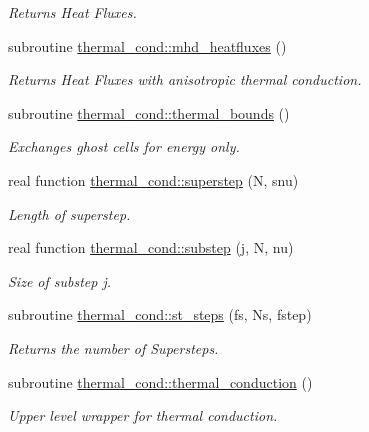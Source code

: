 \begin{DoxyCompactItemize}
\begin{DoxyCompactList}\small\item\em Returns Heat Fluxes. \end{DoxyCompactList}\item 
subroutine \hyperlink{namespacethermal__cond_aab43551b6a0d4b5894c07b510e4571d7}{thermal\+\_\+cond\+::mhd\+\_\+heatfluxes} ()
\begin{DoxyCompactList}\small\item\em Returns Heat Fluxes with anisotropic thermal conduction. \end{DoxyCompactList}\item 
subroutine \hyperlink{namespacethermal__cond_a55e65df0c700580f8af0a090063d2e32}{thermal\+\_\+cond\+::thermal\+\_\+bounds} ()
\begin{DoxyCompactList}\small\item\em Exchanges ghost cells for energy only. \end{DoxyCompactList}\item 
real function \hyperlink{namespacethermal__cond_a535cc1746914d413d4978aeda7b8fc06}{thermal\+\_\+cond\+::superstep} (N, snu)
\begin{DoxyCompactList}\small\item\em Length of superstep. \end{DoxyCompactList}\item 
real function \hyperlink{namespacethermal__cond_a782aaba01217281f2aa57dcc955fd294}{thermal\+\_\+cond\+::substep} (j, N, nu)
\begin{DoxyCompactList}\small\item\em Size of substep j. \end{DoxyCompactList}\item 
subroutine \hyperlink{namespacethermal__cond_a4c74dc0fd6a165d0fea419b560943701}{thermal\+\_\+cond\+::st\+\_\+steps} (fs, Ns, fstep)
\begin{DoxyCompactList}\small\item\em Returns the number of Supersteps. \end{DoxyCompactList}\item 
subroutine \hyperlink{namespacethermal__cond_a4b579df47b3bf4622a3ab51f57aa436b}{thermal\+\_\+cond\+::thermal\+\_\+conduction} ()
\begin{DoxyCompactList}\small\item\em Upper level wrapper for thermal conduction. \end{DoxyCompactList}\end{DoxyCompactItemize}
